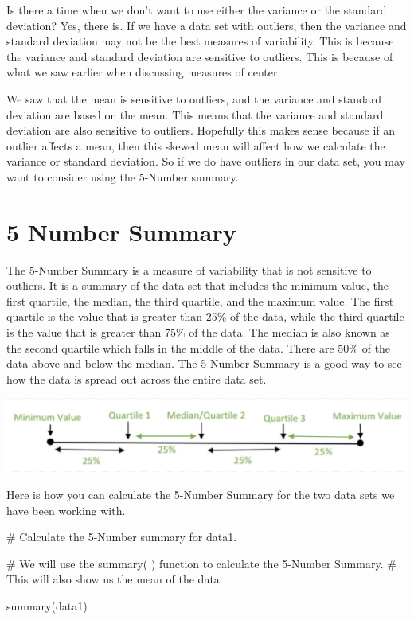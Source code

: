 \documentclass[
  letterpaper,
  DIV=11,
  numbers=noendperiod]{scrreprt}
\newenvironment{Shaded}{\begin{snugshade}}{\end{snugshade}}
\newcommand{\CommentTok}[1]{\textcolor[rgb]{0.37,0.37,0.37}{#1}}
\newcommand{\FunctionTok}[1]{\textcolor[rgb]{0.28,0.35,0.67}{#1}}
\newcommand{\NormalTok}[1]{\textcolor[rgb]{0.00,0.23,0.31}{#1}}
\begin{document}
Is there a time when we don't want to use either the variance or the
standard deviation? Yes, there is. If we have a data set with outliers,
then the variance and standard deviation may not be the best measures of
variability. This is because the variance and standard deviation are
sensitive to outliers. This is because of what we saw earlier when
discussing measures of center.

We saw that the mean is sensitive to outliers, and the variance and
standard deviation are based on the mean. This means that the variance
and standard deviation are also sensitive to outliers. Hopefully this
makes sense because if an outlier affects a mean, then this skewed mean
will affect how we calculate the variance or standard deviation. So if
we do have outliers in our data set, you may want to consider using the
5-Number summary.

\section*{5 Number Summary}\label{number-summary}


The 5-Number Summary is a measure of variability that is not sensitive
to outliers. It is a summary of the data set that includes the minimum
value, the first quartile, the median, the third quartile, and the
maximum value. The first quartile is the value that is greater than 25\%
of the data, while the third quartile is the value that is greater than
75\% of the data. The median is also known as the second quartile which
falls in the middle of the data. There are 50\% of the data above and
below the median. The 5-Number Summary is a good way to see how the data
is spread out across the entire data set.

\includegraphics{./images/MOV-1.jpg}

Here is how you can calculate the 5-Number Summary for the two data sets
we have been working with.

\begin{Shaded}
\begin{Highlighting}[]
\CommentTok{\# Calculate the 5{-}Number summary for data1.}

\CommentTok{\# We will use the summary( ) function to calculate the 5{-}Number Summary. }
\CommentTok{\# This will also show us the mean of the data.}

\FunctionTok{summary}\NormalTok{(data1)}
\end{Highlighting}
\end{Shaded}
\end{document}
